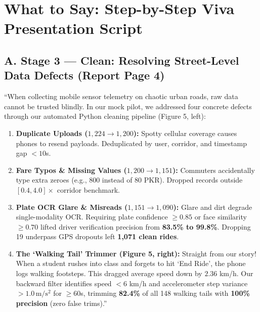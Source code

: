 \documentclass[10pt, a4paper]{article}
\begin{document}
\section{What to Say: Step-by-Step Viva Presentation Script}

\subsection{A. Stage 3 --- Clean: Resolving Street-Level Data Defects (Report Page 4)}
\begin{speaking}
\footnotesize
``When collecting mobile sensor telemetry on chaotic urban roads, raw data cannot be trusted blindly. In our mock pilot, we addressed four concrete defects through our automated Python cleaning pipeline (Figure 5, left):
\begin{enumerate}\setlength{\itemsep}{0.8pt}\setlength{\parskip}{0pt}
  \item \textbf{Duplicate Uploads (\(1,224 \to 1,200\)):} Spotty cellular coverage causes phones to resend payloads. Deduplicated by user, corridor, and timestamp gap \(< 10\)s.
  \item \textbf{Fare Typos \& Missing Values (\(1,200 \to 1,151\)):} Commuters accidentally type extra zeroes (e.g., 800 instead of 80 PKR). Dropped records outside \([0.4, 4.0]\times\) corridor benchmark.
  \item \textbf{Plate OCR Glare \& Misreads (\(1,151 \to 1,090\)):} Glare and dirt degrade single-modality OCR. Requiring plate confidence \(\ge 0.85\) or face similarity \(\ge 0.70\) lifted driver verification precision from \textbf{83.5\% to 99.8\%}. Dropping 19 underpass GPS dropouts left \textbf{1,071 clean rides}.
  \item \textbf{The `Walking Tail' Trimmer (Figure 5, right):} Straight from our story! When a student rushes into class and forgets to hit `End Ride', the phone logs walking footsteps. This dragged average speed down by \(2.36\) km/h. Our backward filter identifies speed \(< 6\) km/h and accelerometer step variance \(> 1.0\,\mathrm{m/s^2}\) for \(\ge 60\)s, trimming \textbf{82.4\%} of all 148 walking tails with \textbf{100\% precision} (zero false trims).''
\end{enumerate}
\end{speaking}
\end{document}
